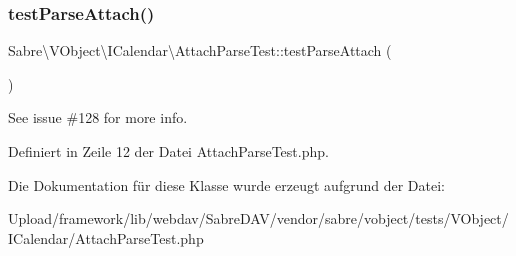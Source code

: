 \subsubsection{\texorpdfstring{test\+Parse\+Attach()}{testParseAttach()}}
{\footnotesize\ttfamily Sabre\textbackslash{}\+V\+Object\textbackslash{}\+I\+Calendar\textbackslash{}\+Attach\+Parse\+Test\+::test\+Parse\+Attach (\begin{DoxyParamCaption}{ }\end{DoxyParamCaption})}

See issue \#128 for more info. 

Definiert in Zeile 12 der Datei Attach\+Parse\+Test.\+php.



Die Dokumentation für diese Klasse wurde erzeugt aufgrund der Datei\+:\begin{DoxyCompactItemize}
\item 
Upload/framework/lib/webdav/\+Sabre\+D\+A\+V/vendor/sabre/vobject/tests/\+V\+Object/\+I\+Calendar/Attach\+Parse\+Test.\+php\end{DoxyCompactItemize}
